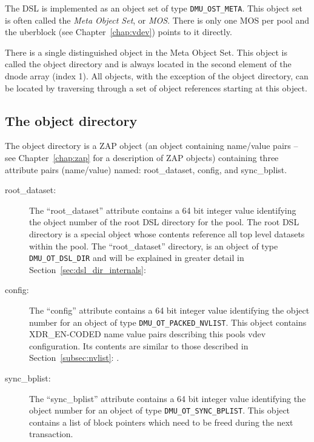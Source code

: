 The DSL is implemented as an object set of type \lstinline{DMU_OST_META}.
This object set is often called the \emph{Meta Object Set}, or \emph{MOS}.
There is only one MOS per pool and the uberblock (see Chapter~\ref{chap:vdev}) points to it directly.

There is a single distinguished object in the Meta Object Set.
This object is called the object directory
and is always located in the second element of the dnode array (index 1).
All objects, with the exception of the object directory,
can be located by traversing through a set of object references starting at this object.

\subsection{The object directory}

The object directory is a ZAP object (an object containing name/value pairs --
see Chapter~\ref{chap:zap} for a description of ZAP objects)
containing three attribute pairs (name/value) named:
root\_dataset, config, and sync\_bplist.

\begin{description}
\item[root\_dataset:]
  The ``root\_dataset''  attribute contains a 64 bit integer value
  identifying the object number of the root DSL directory for the pool.
  The root DSL directory is a special object
  whose contents reference all top level datasets within the pool.
  The ``root\_dataset'' directory,
  is an object of type \lstinline{DMU_OT_DSL_DIR}
  and will be explained in greater detail in Section~\ref{sec:dsl_dir_internals}: 

\item[config:]
  The “config” attribute contains a 64 bit integer value
  identifying the object number for an object of type \lstinline{DMU_OT_PACKED_NVLIST}.
  This object contains XDR\_EN-CODED name value pairs
  describing this pools vdev configuration.
  Its contents are similar to those described in Section~\ref{subsec:nvlist}: .

\item[sync\_bplist:]
  The ``sync\_bplist'' attribute contains a 64 bit integer value
  identifying the object number for an object of type \lstinline{DMU_OT_SYNC_BPLIST}.
  This object contains a list of block pointers which need to be freed during the next transaction.
\end{description}

